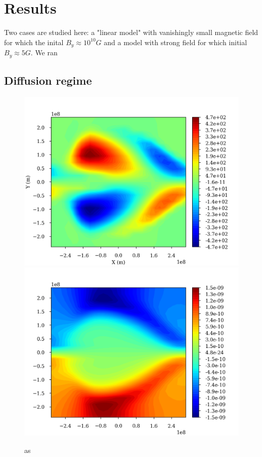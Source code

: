 \documentclass[11pt]{article}
\begin{document}
\section{Results}
Two cases are studied here: a "linear model" with vanishingly small magnetic field for which the inital $B_y \approx 10^{10} G$  and a model with strong field for which initial $B_y \approx 5G $.
We ran 
\subsection{Diffusion regime} 

\begin{figure}[h]
\begin{center}
\includegraphics[scale=0.49]{images/Vy_XYaverage.png}
\includegraphics[scale=0.49]{images/Bx_XYcut_e10.png}
\caption{as}
\label{FlowEta10}
\end{center}
\end{figure}
\end{document}
